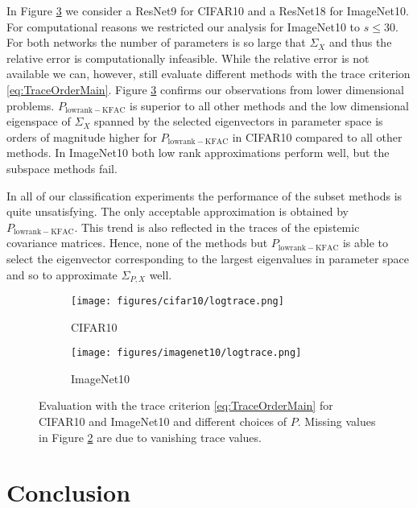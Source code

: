 In Figure \ref{fig:trace_high_dimensional} we consider a ResNet9 for CIFAR10 and a ResNet18 for ImageNet10. For computational reasons we restricted our analysis for ImageNet10 to $s\leq 30$. For both networks the number of parameters is so large that $\Sigma_X$ and thus the relative error is computationally infeasible. 
While the relative error is not available we can, however, still evaluate different methods with the trace criterion \eqref{eq:TraceOrderMain}. Figure \ref{fig:trace_high_dimensional} confirms our observations from lower dimensional problems. $P_{\mathrm{lowrank-KFAC}}$ is superior to all other methods and the low dimensional eigenspace of $\Sigma_X$ spanned by the selected eigenvectors in parameter space is orders of magnitude higher for $P_{\mathrm{lowrank-KFAC}}$ in CIFAR10 compared to all other methods. In ImageNet10 both low rank approximations perform well, but the subspace methods fail. 

In all of our classification experiments the performance of the subset methods is quite unsatisfying. The only acceptable approximation is obtained by $P_{\mathrm{lowrank-KFAC}}$. This trend is also reflected in the traces of the epistemic covariance matrices. Hence, none of the methods but $P_{\mathrm{lowrank-KFAC}}$ is able to select the eigenvector corresponding to the largest eigenvalues in parameter space and so to approximate $\Sigma_{P,X}$ well.


\begin{figure}[t!]
    \centering
    \begin{subfigure}[b]{0.23\textwidth}
        \texttt{[image: figures/cifar10/logtrace.png]}
        \caption{CIFAR10}
        \label{fig:cifar10_resnet9}
    \end{subfigure}
    \hfill
    \begin{subfigure}[b]{0.23\textwidth}
        \texttt{[image: figures/imagenet10/logtrace.png]}
        \caption{ImageNet10}
        \label{fig:imagenet10_resnet18}
    \end{subfigure}
    \caption{Evaluation with the trace criterion \eqref{eq:TraceOrderMain} for CIFAR10 and ImageNet10 and different choices of $P$. Missing values in Figure \ref{fig:imagenet10_resnet18} are due to vanishing trace values.
    }
    \label{fig:trace_high_dimensional}
\end{figure}

\section{Conclusion}

